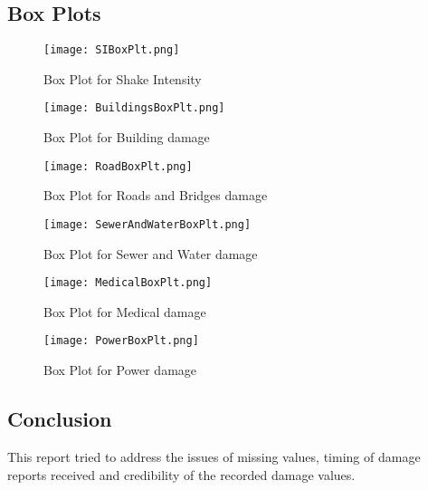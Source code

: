 \documentclass[12pt]{extarticle}
\begin{document}
\subsection{Box Plots}

\begin{figure}[H]
	\centering
	\begin{minipage}{0.5\textwidth}
		\centering
		\texttt{[image: SIBoxPlt.png]}
		\caption{Box Plot for Shake Intensity}
		\label{fig:SIBoxPlt}
	\end{minipage}%
	\begin{minipage}{0.5\textwidth}
		\centering
		\texttt{[image: BuildingsBoxPlt.png]}
		\caption{Box Plot for Building damage}
		\label{fig:BuildingBoxPlt}
	\end{minipage}
\end{figure} 
\begin{figure}[H]
	\centering
	\begin{minipage}{0.5\textwidth}
		\centering
		\texttt{[image: RoadBoxPlt.png]}
		\caption{Box Plot for Roads and Bridges damage}
		\label{fig:RoadBoxPlt}
	\end{minipage}%
	\begin{minipage}{0.5\textwidth}
		\centering
		\texttt{[image: SewerAndWaterBoxPlt.png]}
		\caption{Box Plot for Sewer and Water damage}
		\label{fig:WaterBoxPlt}
	\end{minipage}
\end{figure} 
\begin{figure}[H]
	\centering
	\begin{minipage}{0.5\textwidth}
		\centering
		\texttt{[image: MedicalBoxPlt.png]}
		\caption{Box Plot for Medical damage}
		\label{fig:MedicalBoxPlt}
	\end{minipage}%
	\begin{minipage}{0.5\textwidth}
		\centering
		\texttt{[image: PowerBoxPlt.png]}
		\caption{Box Plot for Power damage}
		\label{fig:PowerBoxPlt}
	\end{minipage}
\end{figure} 

\begin{centering}
	\section{Conclusion}
\end{centering}
This report tried to address the issues of missing values, timing of damage reports received and credibility of the recorded damage values.  \\
\end{document}
